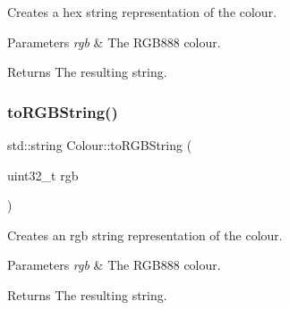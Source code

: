 Creates a hex string representation of the colour. 


\begin{DoxyParams}{Parameters}
{\em rgb} & The R\+G\+B888 colour. \\
\hline
\end{DoxyParams}
\begin{DoxyReturn}{Returns}
The resulting string. 
\end{DoxyReturn}
\mbox{\label{namespaceColour_a317cf8c55a2ec6a9315b50079703ac8f}} 
\subsubsection{\texorpdfstring{to\+R\+G\+B\+String()}{toRGBString()}}
{\footnotesize\ttfamily std\+::string Colour\+::to\+R\+G\+B\+String (\begin{DoxyParamCaption}\item[{uint32\+\_\+t}]{rgb }\end{DoxyParamCaption})}



Creates an rgb string representation of the colour. 


\begin{DoxyParams}{Parameters}
{\em rgb} & The R\+G\+B888 colour. \\
\hline
\end{DoxyParams}
\begin{DoxyReturn}{Returns}
The resulting string. 
\end{DoxyReturn}
